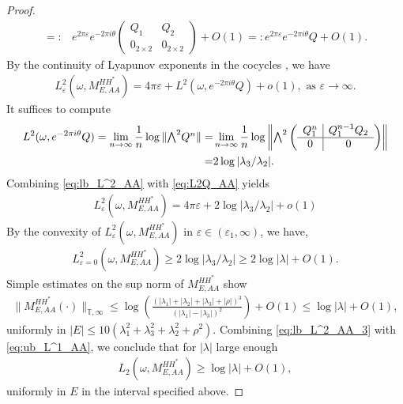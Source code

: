\documentclass[11pt]{amsart}
\newcommand{\T}{\mathbb T}
\begin{document}
\begin{proof}
\begin{align}
=:&e^{2\pi\varepsilon} e^{-2\pi i\theta}
\left(\begin{array}{c|c}
    Q_1 & Q_2\\
    \hline
    0_{2\times 2} & 0_{2\times 2}
\end{array}\right)+O(1)=:e^{2\pi\varepsilon} e^{-2\pi i\theta}Q+O(1).
\end{align}
By the continuity of Lyapunov exponents in the cocycles \cite{AJS}, we have
\begin{align}\label{eq:lb_L^2_AA}
    L^2_{\varepsilon}(\omega,M_{E,AA}^{HH^*})=4\pi\varepsilon+L^2(\omega,e^{-2\pi i\theta}Q)+o(1), \text{ as } \varepsilon\to\infty.
\end{align}
It suffices to compute
\begin{align}\label{eq:L2Q_AA}
    L^2(\omega,e^{-2\pi i\theta}Q)=\lim_{n\to\infty} \frac{1}{n} \log \|\textstyle{\bigwedge}^2 Q^n\|
    =&\lim_{n\to \infty}\frac{1}{n}\log \left\|\textstyle{\bigwedge}^2\left(\begin{array}{c|c}Q_1^n & Q_1^{n-1}Q_2\\ \hline 0 &0\end{array}\right)\right\|\notag\\
    =&2\log |\lambda_3/\lambda_2|. 
\end{align}
Combining \eqref{eq:lb_L^2_AA} with \eqref{eq:L2Q_AA} yields
\begin{align}\label{eq:lb_L^2_AA_2}
    L^2_{\varepsilon}(\omega,M_{E,AA}^{HH^*})=4\pi\varepsilon+2\log |\lambda_3/\lambda_2|+o(1)
\end{align}
By the convexity of $L^2_{\varepsilon}(\omega,M_{E,AA}^{HH^*})$ in $\varepsilon\in (\varepsilon_1,\infty)$, we have,
\begin{align}\label{eq:lb_L^2_AA_3}
    L^2_{\varepsilon=0}(\omega,M_{E,AA}^{HH^*})\geq 2\log |\lambda_3/\lambda_2|\geq 2\log |\lambda|+O(1).
\end{align}
Simple estimates on the sup norm of $M_{E,AA}^{HH^*}$ show
\begin{align}\label{eq:ub_L^1_AA}
    \|M_{E,AA}^{HH^*}(\cdot)\|_{\T,\infty}\leq \log \left(\frac{(|\lambda_1|+|\lambda_2|+|\lambda_3|+|\rho|)^3}{(|\lambda_1|-|\lambda_3|)^2}\right)+O(1)\leq \log |\lambda|+O(1),
    \end{align}
    uniformly in $|E|\leq 10(\lambda_1^2+\lambda_3^2+\lambda_2^2+\rho^2)$.
Combining \eqref{eq:lb_L^2_AA_3} with \eqref{eq:ub_L^1_AA}, we conclude that for $|\lambda|$ large enough
\begin{align}
    L_2(\omega,M_{E,AA}^{HH^*})\geq \log |\lambda|+O(1),
\end{align}
uniformly in $E$ in the interval specified above.
\end{proof}
\end{document}

